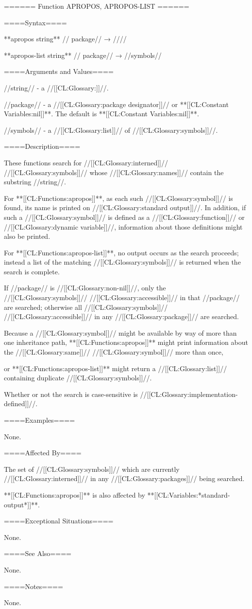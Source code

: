 ====== Function APROPOS, APROPOS-LIST ======

====Syntax====

**apropos {string** //\opt} package// → //\novalues//

**apropos-list {string** //\opt} package// → //symbols//

====Arguments and Values====

//string// - a //[[CL:Glossary:\symbolnamedesignator]]//.

//package// - a //[[CL:Glossary:package designator]]// or **[[CL:Constant Variables:nil]]**. The default is **[[CL:Constant Variables:nil]]**.

//symbols// - a //[[CL:Glossary:list]]// of //[[CL:Glossary:symbols]]//.

====Description====

These functions search for //[[CL:Glossary:interned]]// //[[CL:Glossary:symbols]]// whose //[[CL:Glossary:names]]// contain the substring //string//.

For **[[CL:Functions:apropos]]**, as each such //[[CL:Glossary:symbol]]// is found, its name is printed on //[[CL:Glossary:standard output]]//. In addition, if such a //[[CL:Glossary:symbol]]// is defined as a //[[CL:Glossary:function]]// or //[[CL:Glossary:dynamic variable]]//, information about those definitions might also be printed.

For **[[CL:Functions:apropos-list]]**, no output occurs as the search proceeds; instead a list of the matching //[[CL:Glossary:symbols]]// is returned when the search is complete.

If //package// is //[[CL:Glossary:non-nil]]//, only the //[[CL:Glossary:symbols]]// //[[CL:Glossary:accessible]]// in that //package// are searched; otherwise all //[[CL:Glossary:symbols]]// //[[CL:Glossary:accessible]]// in any //[[CL:Glossary:package]]// are searched.

Because a //[[CL:Glossary:symbol]]// might be available by way of more than one inheritance path, **[[CL:Functions:apropos]]** might print information about the //[[CL:Glossary:same]]// //[[CL:Glossary:symbol]]// more than once,

or **[[CL:Functions:apropos-list]]** might return a //[[CL:Glossary:list]]// containing duplicate //[[CL:Glossary:symbols]]//.

Whether or not the search is case-sensitive is //[[CL:Glossary:implementation-defined]]//.

====Examples====

None.

====Affected By====

The set of //[[CL:Glossary:symbols]]// which are currently //[[CL:Glossary:interned]]// in any //[[CL:Glossary:packages]]// being searched.

**[[CL:Functions:apropos]]** is also affected by **[[CL:Variables:*standard-output*]]**.

====Exceptional Situations====

None.

====See Also====

None.

====Notes====

None.

